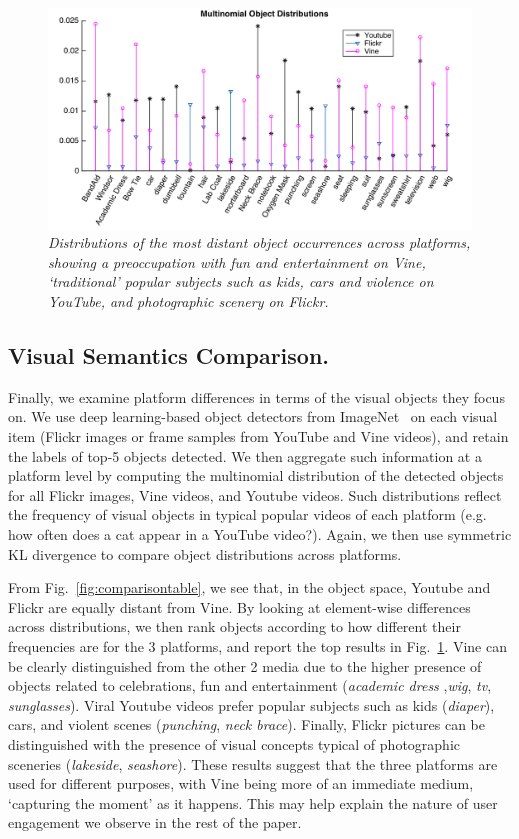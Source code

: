 \begin{figure}[!htb]
\centering
\includegraphics[width=\columnwidth]{plots/comparison/objects}
\caption{\textsl{ Distributions of the most distant object occurrences across platforms, showing a preoccupation with fun and entertainment on Vine, `traditional' popular subjects such as kids, cars and violence on YouTube, and photographic scenery on Flickr.}}
\label{fig:comparison_objects}
\end{figure}

\subsection{Visual Semantics Comparison.} 
Finally, we examine platform differences in terms of the visual objects they focus on.  We use deep learning-based object detectors from ImageNet~\cite{krizhevsky2012imagenet} on each visual item (Flickr images or frame samples from YouTube and Vine videos), and retain the labels of top-5 objects detected. We then aggregate such information at a platform level by computing the multinomial distribution of the detected objects for all Flickr images, Vine videos, and Youtube videos.  Such distributions reflect  the frequency of visual objects in typical popular videos of each platform (e.g. how often does a cat appear in a YouTube video?). Again, we then use symmetric KL divergence to compare object distributions across platforms.



 From Fig.~\ref{fig:comparisontable}, we see that, in the object space, Youtube and Flickr are equally distant from Vine. By looking at element-wise differences across distributions, we then rank objects according to how different their frequencies are for the 3 platforms, and report the top results in Fig.~\ref{fig:comparison_objects}. Vine can be clearly distinguished from the other 2 media due to the higher presence of objects related to celebrations, fun and entertainment (\emph{academic dress} ,\emph{wig}, \emph{tv}, \emph{sunglasses}). Viral Youtube videos prefer popular subjects such as kids (\emph{diaper}), cars, and  violent scenes (\emph{punching}, \emph{neck brace}). Finally, Flickr pictures can be distinguished with the presence of visual concepts typical of photographic sceneries (\emph{lakeside}, \emph{seashore}). These results suggest that the three platforms are used for different purposes, with Vine being more of an immediate medium, `capturing the moment' as it happens. This may help explain the nature of user engagement we observe in the rest of the paper.
%


